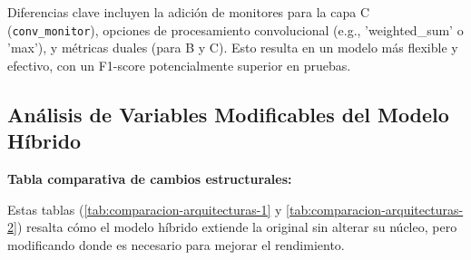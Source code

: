 Diferencias clave incluyen la adición de monitores para la capa C (\texttt{conv\_monitor}), opciones de procesamiento convolucional (e.g., 'weighted\_sum' o 'max'), y métricas duales (para B y C). Esto resulta en un modelo más flexible y efectivo, con un F1-score potencialmente superior en pruebas.


\subsection{Análisis de Variables Modificables del Modelo Híbrido}

\textbf{Tabla comparativa de cambios estructurales:}

Estas tablas (\ref{tab:comparacion-arquitecturas-1} y \ref{tab:comparacion-arquitecturas-2})  resalta cómo el modelo híbrido extiende la original sin alterar su núcleo, pero modificando donde es necesario para mejorar el rendimiento.


